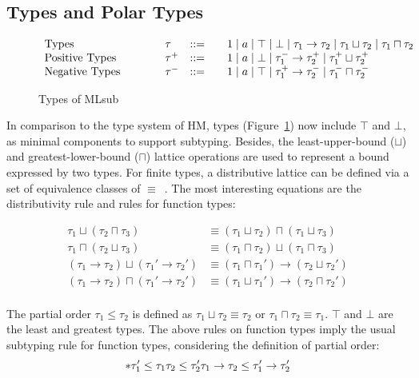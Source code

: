 \subsection{Types and Polar Types}

\begin{figure}[t]
    \[
    \begin{array}{l@{\qquad}lcl}
    \text{Types}\qquad&\tau &::=&\quad 1 \mid a \mid \top \mid \bot \mid \tau_1 \to \tau_2 \mid
        \tau_1 \sqcup \tau_2 \mid \tau_1 \sqcap \tau_2 \\
    \text{Positive Types}\qquad&\tau^+ &::=&\quad 1 \mid a \mid \bot \mid \tau_1^-\to \tau_2^+ \mid
        \tau_1^+ \sqcup \tau_2^+\\
    \text{Negative Types}\qquad&\tau^- &::=&\quad 1 \mid a \mid \top \mid \tau_1^+\to \tau_2^- \mid
        \tau_1^- \sqcap \tau_2^-\\
    \end{array}
    \]
    \caption{Types of MLsub}\label{fig:mlsub:types}
\end{figure}

In comparison to the type system of HM, types (Figure~\ref{fig:mlsub:types})
now include $\top$ and $\bot$,
as minimal components to support subtyping.
Besides, the least-upper-bound ($\sqcup$) and greatest-lower-bound ($\sqcap$) lattice operations
are used to represent a bound expressed by two types.
For finite types, a distributive lattice can be defined via a set of equivalence classes
of $\equiv$~\citep{mlsub}.
The most interesting equations are the distributivity rule and rules for function types:

\[\begin{aligned}
    \tau_1 \sqcup (\tau_2 \sqcap \tau_3) &\equiv
        (\tau_1 \sqcup \tau_2) \sqcap (\tau_1 \sqcup \tau_3)\\
    \tau_1 \sqcap (\tau_2 \sqcup \tau_3) &\equiv
        (\tau_1 \sqcap \tau_2) \sqcup (\tau_1 \sqcap \tau_3)\\
    (\tau_1 \to \tau_2) \sqcup (\tau_1' \to \tau_2') &\equiv 
        (\tau_1 \sqcap \tau_1') \to (\tau_2 \sqcup \tau_2')\\
    (\tau_1 \to \tau_2) \sqcap (\tau_1' \to \tau_2') &\equiv 
        (\tau_1 \sqcup \tau_1') \to (\tau_2 \sqcap \tau_2')\\
\end{aligned}\]

The partial order $\tau_1 \le \tau_2$ is defined as $\tau_1 \sqcup \tau_2 \equiv \tau_2$ or
$\tau_1 \sqcap \tau_2 \equiv \tau_1$.
$\top$ and $\bot$ are the least and greatest types.
The above rules on function types imply the usual subtyping rule for function types,
considering the definition of partial order:
\[
    *
    {\tau_1' \le \tau_1 \\ \tau_2 \le \tau_2'}
    {\tau_1 \to \tau_2 \le \tau_1' \to \tau_2'}
\]

